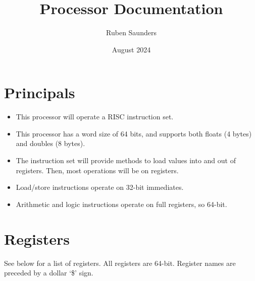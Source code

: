 \documentclass{article}
\title{Processor Documentation}
\author{Ruben Saunders}
\date{August 2024}
\begin{document}
\maketitle

\section{Principals}

\begin{itemize}
    \item This processor will operate a RISC instruction set.
    \item This processor has a word size of 64 bits, and supports both floats (4 bytes) and doubles (8 bytes).
    \item The instruction set will provide methods to load values into and out of registers.
    Then, most operations will be on registers.
    \item Load/store instructions operate on 32-bit immediates.
    \item Arithmetic and logic instructions operate on full registers, so 64-bit.
\end{itemize}

\section{Registers}

See below for a list of registers.
All registers are 64-bit.
Register names are preceded by a dollar `\$' sign.
\end{document}
